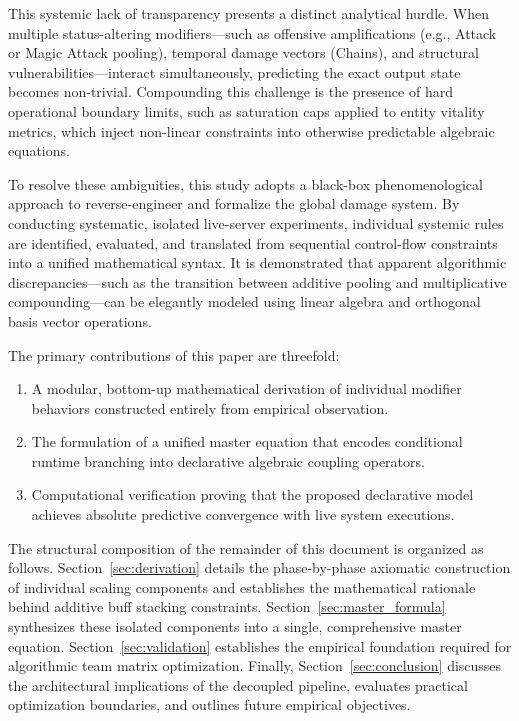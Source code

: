 \documentclass[twocolumn,10pt]{article}
\begin{document}
This systemic lack of transparency presents a distinct analytical hurdle. When multiple status-altering modifiers—such as offensive amplifications (e.g., Attack or Magic Attack pooling), temporal damage vectors (Chains), and structural vulnerabilities—interact simultaneously, predicting the exact output state becomes non-trivial. Compounding this challenge is the presence of hard operational boundary limits, such as saturation caps applied to entity vitality metrics, which inject non-linear constraints into otherwise predictable algebraic equations.

To resolve these ambiguities, this study adopts a black-box phenomenological approach to reverse-engineer and formalize the global damage system. By conducting systematic, isolated live-server experiments, individual systemic rules are identified, evaluated, and translated from sequential control-flow constraints into a unified mathematical syntax. It is demonstrated that apparent algorithmic discrepancies—such as the transition between additive pooling and multiplicative compounding—can be elegantly modeled using linear algebra and orthogonal basis vector operations.

The primary contributions of this paper are threefold:
\begin{enumerate}
  \item A modular, bottom-up mathematical derivation of individual modifier behaviors constructed entirely from empirical observation.
  \item The formulation of a unified master equation that encodes conditional runtime branching into declarative algebraic coupling operators.
  \item Computational verification proving that the proposed declarative model achieves absolute predictive convergence with live system executions.
\end{enumerate}

The structural composition of the remainder of this document is organized as follows. Section~\ref{sec:derivation} details the phase-by-phase axiomatic construction of individual scaling components and establishes the mathematical rationale behind additive buff stacking constraints. Section~\ref{sec:master_formula} synthesizes these isolated components into a single, comprehensive master equation. Section~\ref{sec:validation} establishes the empirical foundation required for algorithmic team matrix optimization. Finally, Section~\ref{sec:conclusion} discusses the architectural implications of the decoupled pipeline, evaluates practical optimization boundaries, and outlines future empirical objectives.
\end{document}
